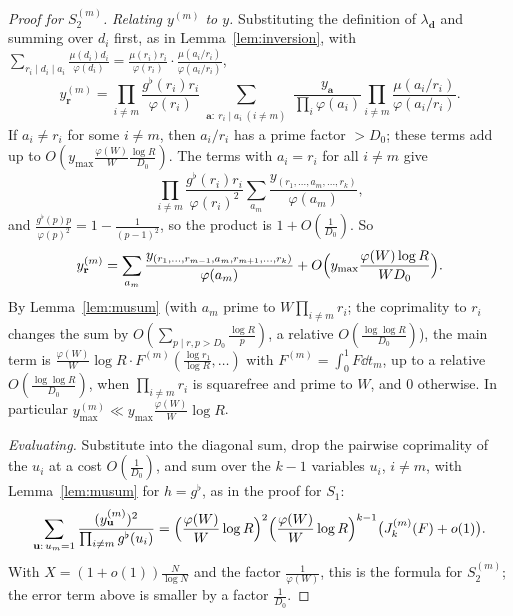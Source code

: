 \begin{proof}[Proof for $S_2^{(m)}$]
\emph{Relating $y^{(m)}$ to $y$.} Substituting the definition of $\lambda_{\mathbf d}$ and summing over $d_i$ first, as in Lemma~\ref{lem:inversion}, with $\sum_{r_i\mid d_i\mid a_i}\frac{\mu(d_i)d_i}{\varphi(d_i)}=\frac{\mu(r_i)r_i}{\varphi(r_i)}\cdot\frac{\mu(a_i/r_i)}{\varphi(a_i/r_i)}$,
\[
y^{(m)}_{\mathbf r}=\prod_{i\ne m}\frac{g^\flat(r_i)r_i}{\varphi(r_i)}\sum_{\substack{\mathbf a:\ r_i\mid a_i\ (i\ne m)}}\frac{y_{\mathbf a}}{\prod_i\varphi(a_i)}\prod_{i\ne m}\frac{\mu(a_i/r_i)}{\varphi(a_i/r_i)}.
\]
If $a_i\ne r_i$ for some $i\ne m$, then $a_i/r_i$ has a prime factor $>D_0$; these terms add up to $O(y_{\max}\frac{\varphi(W)}W\frac{\log R}{D_0})$. The terms with $a_i=r_i$ for all $i\ne m$ give
\[
\prod_{i\ne m}\frac{g^\flat(r_i)r_i}{\varphi(r_i)^2}\sum_{a_m}\frac{y_{(r_1,\dots,a_m,\dots,r_k)}}{\varphi(a_m)},
\]
and $\frac{g^\flat(p)p}{\varphi(p)^2}=1-\frac1{(p-1)^2}$, so the product is $1+O(\frac1{D_0})$. So
\[
y^{(m)}_{\mathbf r}=\sum_{a_m}\frac{y_{(r_1,\dots,r_{m-1},a_m,r_{m+1},\dots,r_k)}}{\varphi(a_m)}+O\Bigl(y_{\max}\frac{\varphi(W)\log R}{WD_0}\Bigr).
\]
By Lemma~\ref{lem:musum} (with $a_m$ prime to $W\prod_{i\ne m}r_i$; the coprimality to $r_i$ changes the sum by $O(\sum_{p\mid r,p>D_0}\frac{\log R}p)$, a relative $O(\frac{\log\log R}{D_0})$), the main term is $\frac{\varphi(W)}W\log R\cdot F^{(m)}(\frac{\log r_1}{\log R},\dots)$ with $F^{(m)}=\int_0^1F\dd t_m$, up to a relative $O(\frac{\log\log R}{D_0})$, when $\prod_{i\ne m}r_i$ is squarefree and prime to $W$, and $0$ otherwise. In particular $y^{(m)}_{\max}\ll y_{\max}\frac{\varphi(W)}W\log R$.

\emph{Evaluating.} Substitute into the diagonal sum, drop the pairwise coprimality of the $u_i$ at a cost $O(\frac1{D_0})$, and sum over the $k-1$ variables $u_i$, $i\ne m$, with Lemma~\ref{lem:musum} for $h=g^\flat$, as in the proof for $S_1$:
\[
\sum_{\mathbf u:\,u_m=1}\frac{(y^{(m)}_{\mathbf u})^2}{\prod_{i\ne m}g^\flat(u_i)}=\Bigl(\frac{\varphi(W)}W\log R\Bigr)^2\Bigl(\frac{\varphi(W)}W\log R\Bigr)^{k-1}\bigl(J_k^{(m)}(F)+o(1)\bigr).
\]
With $X=(1+o(1))\frac N{\log N}$ and the factor $\frac1{\varphi(W)}$, this is the formula for $S_2^{(m)}$; the error term above is smaller by a factor $\frac1{D_0}$.
\end{proof}

